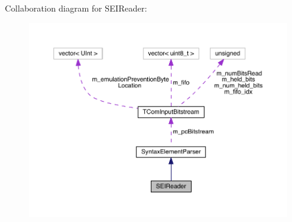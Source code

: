 Collaboration diagram for S\+E\+I\+Reader\+:
\nopagebreak
\begin{figure}[H]
\begin{center}
\leavevmode
\includegraphics[width=350pt]{dc/d6d/class_s_e_i_reader__coll__graph}
\end{center}
\end{figure}
